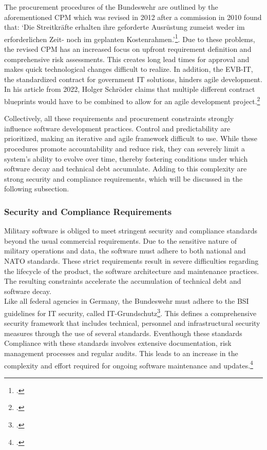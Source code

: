 The procurement procedures of the Bundeswehr are outlined by the aforementioned \ac{CPM} which was revised in 2012 after a commission in 2010 found that: 
`Die Streitkräfte erhalten ihre geforderte Ausrüstung zumeist weder im erforderlichen Zeit- noch im geplanten Kostenrahmen.'\footcite[36]{strukturkommissionderbundeswehrBerichtStrukturkommissionBundeswehr2010}.
Due to these problems, the revised \ac{CPM} has an increased focus on upfront requirement definition and comprehensive risk assessments. This creates long lead times
for approval and makes quick technological changes difficult to realize.
In addition, the \ac{EVB-IT}, the standardized contract for government IT solutions, hinders agile development. In his article from 2022,
Holger Schröder claims that multiple different contract blueprints would have to be combined to allow for an agile development project.\footcite{schroederUngeeignetFuerAgile2022}

Collectively, all these requirements and procurement constraints strongly influence software development practices. Control and predictability are prioritized, making
an iterative and agile framework difficult to use. While these procedures promote accountability and reduce risk, they can severely limit a system's ability to evolve over time, thereby fostering conditions under which software decay and technical debt accumulate. 
Adding to this complexity are strong security and compliance requirements, which will be discussed in the following subsection.

\subsubsection{Security and Compliance Requirements}
Military software is obliged to meet stringent security and compliance standards beyond the usual commercial requirements. Due to the sensitive nature of military operations and data,
the software must adhere to both national and NATO standards. These strict requirements result in severe difficulties 
regarding the lifecycle of the product, the software architecture and maintenance practices. The resulting constraints accelerate the accumulation of technical debt and software decay.\\

Like all federal agencies in Germany, the Bundeswehr must adhere to the \ac{BSI} guidelines for IT security, called IT-Grundschutz\footcite{bundesamtfuersicherheitinderinformationstechnikBSIFAQ}. This defines a comprehensive security framework
that includes technical, personnel and infrastructural security measures through the use of several standards. Eventhough these standards Compliance with these standards involves extensive documentation, risk management processes and regular audits. 
This leads to an increase in the complexity and effort required for ongoing software maintenance and updates.\footcite{bundesamtfuersicherheitinderinformationstechnikBSIStandards}\\

